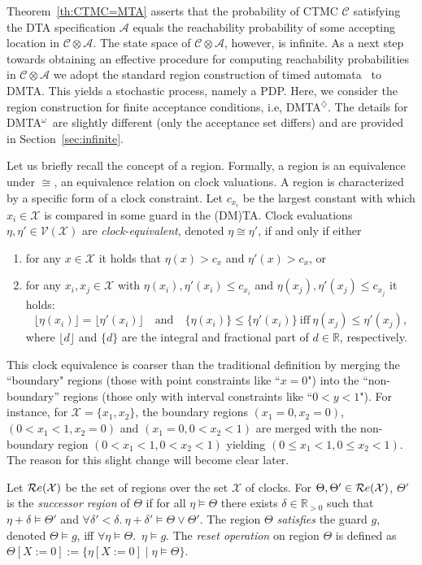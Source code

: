 \documentclass{LMCS}
\newcommand{\mc}[1]{\mathcal{#1}}
\newcommand{\<}{\langle}
\renewcommand{\>}{\rangle}
\newcommand{\les}{\leqslant}
\newcommand{\mX}{\mathcal{X}}
\newcommand{\mV}{\mathcal{V}}
\newcommand{\DMTAr}{\DMTA$^{\!\Ever}$}
\newcommand{\DMTAo}{\DMTA$^{\omega}$}
\newcommand{\DMTA}{\textsc{DMTA}}
\newcommand{\F}{\mathop{\diamondsuit}}
\newcommand{\Reals}{\mathbb{R}}
\newcommand{\Ever}{\F}
\begin{document}
Theorem~\ref{th:CTMC=MTA} asserts that the probability of CTMC $\mc{C}$
satisfying the DTA specification $\mc{A}$ equals the reachability probability
of some accepting location in $\mc{C} \otimes \mc{A}$.  The state space
of $\mc{C} \otimes \mc{A}$, however, is infinite.   As a next step towards obtaining
an effective procedure for computing reachability probabilities in $\mc{C} \otimes
\mc{A}$ we adopt the standard region construction of timed automata~\cite{AD94}
to \DMTA.   This yields a stochastic process, namely a PDP.  Here, we
consider the region construction for finite acceptance conditions, i.e, \DMTAr.  The
details for \DMTAo\ are slightly different (only the acceptance set differs) and are
provided in Section~\ref{sec:infinite}.

Let us briefly recall the concept of a region.
Formally, a region is an equivalence under $\cong$, an equivalence relation on
clock valuations.
A region is characterized by a specific form of a clock constraint.
Let $c_{x_i}$ be the largest constant with which $x_i \in \mX$ is compared in some
guard in the (DM)TA.
Clock evaluations $\eta, \eta'\in \mV(\mX)$ are \emph{clock-equivalent}, denoted
$\eta \cong \eta'$, if and only if either
\begin{enumerate}
\item
for any $x \in \mX$ it holds that $\eta(x) >c_x$ and $\eta'(x) > c_x$, or
\item
for any $x_i, x_j\in\mX$ with $\eta(x_i), \eta'(x_i) \les c_{x_i}$ and $\eta(x_j), \eta'(x_j)
\les c_{x_j}$ it holds:
	$$\lfloor \eta(x_i) \rfloor = \lfloor \eta'(x_i) \rfloor \quad \mbox{and} \quad
		             \{ \eta(x_i) \} \les \{ \eta'(x_i) \} \ \mbox{iff} \ { \eta(x_j) } \les { \eta'(x_j) },
    $$
    where $\lfloor d \rfloor$ and $\{ d \}$ are the integral and fractional part of $d \in \Reals$,
    respectively.
\end{enumerate}


This clock equivalence is coarser than the traditional definition by merging the ``boundary"
regions (those with point constraints like ``$x=0$") into the ``non-boundary'' regions
(those only with interval constraints like ``$0 < y <1$").
For instance, for $\mc{X} = \{ x_1, x_2 \}$, the boundary regions $(x_1 = 0, x_2 = 0)$,
$(0 < x_1 < 1, x_2 = 0)$ and $(x_1 = 0, 0 < x_2 < 1)$ are merged with the non-boundary
region $(0 < x_1 < 1, 0 < x_2 < 1)$ yielding $(0 \les x_1 < 1, 0 \les x_2 < 1)$.
The reason for this slight change will become clear later.

Let $\mRe(\mX)$ be the set of regions over the set $\mc{X}$ of clocks.
For $\Theta, \Theta' \in \mRe(\mc{X})$, $\Theta'$ is the \emph{successor region} of $\Theta$
if for all $\eta \models \Theta$ there exists $\delta \in \Reals_{>0}$ such that $\eta{+}\delta \models \Theta'$ and $\forall {\delta'<\delta}.\ \eta{+}\delta' \models \Theta\vee\Theta'$.
The region $\Theta$ \emph{satisfies} the guard $g$, denoted $\Theta\models g$, iff $\forall
\eta \models \Theta$.\ $\eta\models g$.
The \emph{reset operation} on region $\Theta$ is defined as $\Theta[X:=0] :=
\big\{\eta[X:=0]\mid \eta\models \Theta\big\}$.
\end{document}
